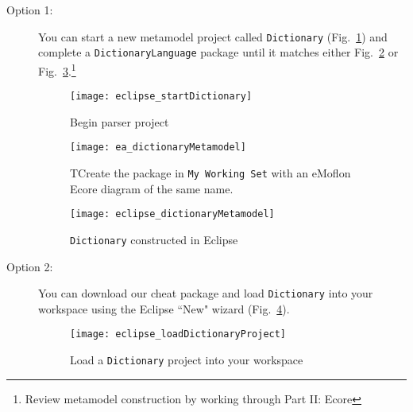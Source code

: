 \begin{description}
\item[Option 1:] You can start a new metamodel project called \texttt{Dictionary} (Fig.~\ref{eclipse:startMetamodel}) and complete a
\texttt{DictionaryLanguage} package until it matches either Fig.~\ref{ea:dictLang} or Fig.~\ref{eclipse:dictLang}.\footnote{Review metamodel construction by
working through Part II: Ecore}

\begin{figure}[htbp]
\begin{center}
  \texttt{[image: eclipse\_startDictionary]}
  \caption{Begin parser project}
  \label{eclipse:startMetamodel}
\end{center}
\end{figure}

\newpage

\vspace*{1cm}

\begin{figure}[htb]
\begin{center}
  \texttt{[image: ea\_dictionaryMetamodel]}
  \caption{TCreate the package in \texttt{My Working Set} with an eMoflon Ecore diagram of the same name.}
  \label{ea:dictLang}
\end{center}
\end{figure}

\vspace{1cm}

\begin{figure}[htb]
\begin{center}
  \texttt{[image: eclipse\_dictionaryMetamodel]}
  \caption{\texttt{Dictionary} constructed in Eclipse \update}
  \label{eclipse:dictLang}
\end{center}
\end{figure}

\newpage

\newpage
\item[Option 2:] You can download our cheat package and load \texttt{Dictionary} into your workspace using the Eclipse ``New" wizard
(Fig.~\ref{eclipse_cheatPackage}).

\vspace{0.5cm}

\begin{figure}[htbp]
\begin{center}
  \texttt{[image: eclipse\_loadDictionaryProject]}
  \caption{Load a \texttt{Dictionary} project into your workspace}
  \label{eclipse_cheatPackage}
\end{center}
\end{figure}


\end{description}
